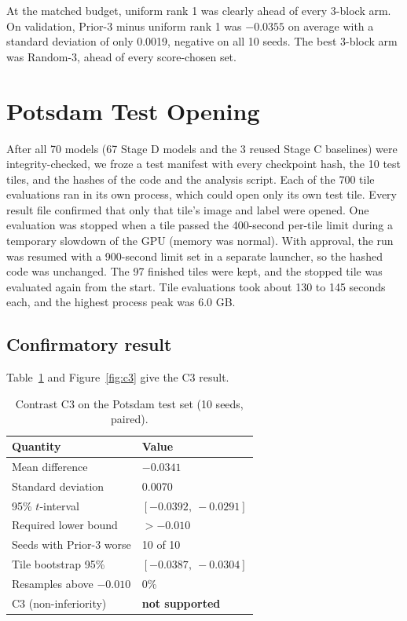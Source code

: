 \documentclass[11pt,a4paper]{report}
\begin{document}
At the matched budget, uniform rank 1 was clearly ahead of every 3-block arm. On validation, Prior-3 minus uniform rank 1 was $-0.0355$ on average with a standard deviation of only 0.0019, negative on all 10 seeds. The best 3-block arm was Random-3, ahead of every score-chosen set.

\section{Potsdam Test Opening}

After all 70 models (67 Stage D models and the 3 reused Stage C baselines) were integrity-checked, we froze a test manifest with every checkpoint hash, the 10 test tiles, and the hashes of the code and the analysis script. Each of the 700 tile evaluations ran in its own process, which could open only its own test tile. Every result file confirmed that only that tile's image and label were opened. One evaluation was stopped when a tile passed the 400-second per-tile limit during a temporary slowdown of the GPU (memory was normal). With approval, the run was resumed with a 900-second limit set in a separate launcher, so the hashed code was unchanged. The 97 finished tiles were kept, and the stopped tile was evaluated again from the start. Tile evaluations took about 130 to 145 seconds each, and the highest process peak was 6.0 GB.

\subsection{Confirmatory result}

Table~\ref{tab:c3} and Figure~\ref{fig:c3} give the C3 result.

\begin{table}[t]
\centering
\caption{Contrast C3 on the Potsdam test set (10 seeds, paired).}
\label{tab:c3}
\small
\begin{tabular}{@{}ll@{}}
\toprule
\textbf{Quantity} & \textbf{Value} \\
\midrule
Mean difference & $-0.0341$ \\
Standard deviation & 0.0070 \\
95\% $t$-interval & $[-0.0392,\ -0.0291]$ \\
Required lower bound & $> -0.010$ \\
Seeds with Prior-3 worse & 10 of 10 \\
Tile bootstrap 95\% & $[-0.0387,\ -0.0304]$ \\
Resamples above $-0.010$ & 0\% \\
\midrule
C3 (non-inferiority) & \textbf{not supported} \\
\bottomrule
\end{tabular}
\end{table}
\end{document}
